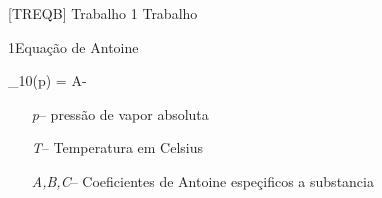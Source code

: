 \documentclass[\mainfilename]{subfiles}
\begin{document}
[TREQB]
{Trabalho 1} %
{Trabalho} %

\begin{definitionBox}1{Equação de Antoine} %
    
    \begin{BM}
        \log_10(p) = A-
    \end{BM}

    \begin{itemize}[left=3em]
        \item[\textit{p}--] pressão de vapor absoluta
        \item[\textit{T}--] Temperatura em Celsius
        \item[\textit{A,B,C}--] Coeficientes de Antoine espeçificos a substancia
    \end{itemize}
    
\end{definitionBox}
\end{document}
